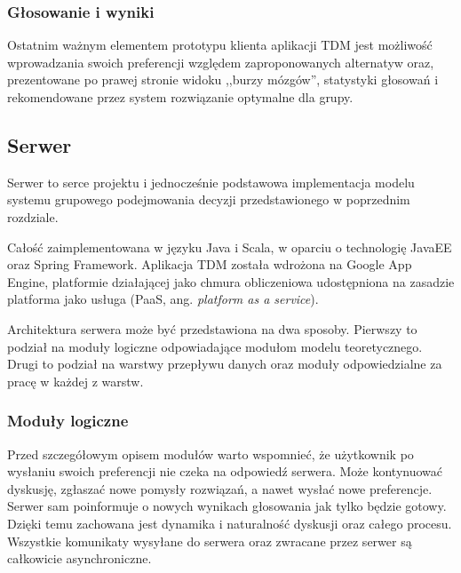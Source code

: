 \subsubsection{Głosowanie i wyniki}
Ostatnim ważnym elementem prototypu klienta aplikacji TDM jest możliwość
wprowadzania swoich preferencji względem zaproponowanych alternatyw oraz,
prezentowane po prawej stronie widoku ,,burzy mózgów'', statystyki głosowań i
rekomendowane przez system rozwiązanie optymalne dla grupy.

\subsection{Serwer}
Serwer to serce projektu i jednocześnie podstawowa implementacja modelu systemu
grupowego podejmowania decyzji przedstawionego w poprzednim rozdziale. 

Całość zaimplementowana w języku Java i Scala, w oparciu o technologię JavaEE
oraz Spring Framework. Aplikacja TDM została wdrożona na Google App Engine,
platformie działającej jako chmura obliczeniowa udostępniona na
zasadzie platforma jako usługa (PaaS, ang. \textit{platform as a service}).

Architektura serwera może być przedstawiona na dwa sposoby. Pierwszy to podział
na moduły logiczne odpowiadające modułom modelu teoretycznego. Drugi to podział
na warstwy przepływu danych oraz moduły odpowiedzialne za pracę w każdej z warstw.

\subsubsection{Moduły logiczne}
Przed szczegółowym opisem modułów warto wspomnieć, że użytkownik po wysłaniu
swoich preferencji nie czeka na odpowiedź serwera. Może kontynuować dyskusję,
zgłaszać nowe pomysły rozwiązań, a nawet wysłać nowe preferencje. Serwer sam
poinformuje o nowych wynikach głosowania jak tylko będzie gotowy. Dzięki temu
zachowana jest dynamika i naturalność dyskusji oraz całego procesu. Wszystkie
komunikaty wysyłane do serwera oraz zwracane przez serwer są całkowicie
asynchroniczne.

